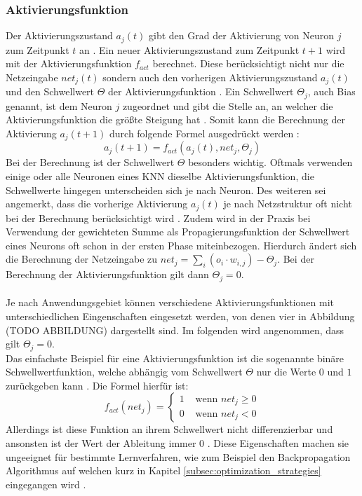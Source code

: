 \subsubsection{Aktivierungsfunktion}
Der Aktivierungszustand $a_j(t)$ gibt den Grad der Aktivierung von Neuron $j$ zum Zeitpunkt $t$ an \cite{zell2003simulation}. Ein neuer Aktivierungszustand zum Zeitpunkt $t+1$ wird mit der Aktivierungsfunktion $f_{act}$ berechnet. Diese berücksichtigt nicht nur die Netzeingabe $net_j(t)$ sondern auch den vorherigen Aktivierungszustand $a_j(t)$ und den Schwellwert $\Theta$ der Aktivierungsfunktion \cite{zell2003simulation}. Ein Schwellwert $\Theta_j$, auch Bias genannt, ist dem Neuron $j$ zugeordnet und gibt die Stelle an, an welcher die Aktivierungsfunktion die größte Steigung hat \cite{kriesel2008kleiner}. Somit kann die Berechnung der Aktivierung $a_j(t+1)$ durch folgende Formel ausgedrückt werden \cite{zell2003simulation}:
$$a_j(t+1)=f_{act}(a_j(t), net_j, \Theta_j)$$
Bei der Berechnung ist der Schwellwert $\Theta$ besonders wichtig. Oftmals verwenden einige oder alle Neuronen eines \ac{KNN} dieselbe Aktivierungsfunktion, die Schwellwerte hingegen unterscheiden sich je nach Neuron. Des weiteren sei angemerkt, dass  die vorherige Aktivierung $a_j(t)$ je nach Netzstruktur oft nicht bei der Berechnung berücksichtigt wird \cite{kriesel2008kleiner}. Zudem wird in der Praxis bei Verwendung der gewichteten Summe als Propagierungsfunktion der Schwellwert eines Neurons oft schon in der ersten Phase miteinbezogen. Hierdurch ändert sich die Berechnung der Netzeingabe zu $net_j=\sum_{i}(o_{i} \cdot w_{i, j}) - \Theta_j$. Bei der Berechnung der Aktivierungsfunktion gilt dann $\Theta_j = 0$.
\\\\
Je nach Anwendungsgebiet können verschiedene Aktivierungsfunktionen mit unterschiedlichen Eingenschaften eingesetzt werden, von denen vier in Abbildung (TODO ABBILDUNG) dargestellt sind. Im folgenden wird angenommen, dass gilt $\Theta_j=0$.\\
Das einfachste Beispiel für eine Aktivierungsfunktion ist die sogenannte binäre Schwellwertfunktion, welche abhängig vom Schwellwert $\Theta$ nur die Werte $0$ und $1$ zurückgeben kann \cite{kriesel2008kleiner}. Die Formel hierfür ist: 
$$
f_{act}(net_j)=\left\{\begin{array}{ll}
1 & \text { wenn } net_j \geq 0 \\
0 & \text { wenn } net_j < 0
\end{array}\right.
$$
Allerdings ist diese Funktion an ihrem Schwellwert nicht differenzierbar und ansonsten ist der Wert der Ableitung immer 0 \cite{kriesel2008kleiner}. Diese Eigenschaften machen sie ungeeignet für bestimmte Lernverfahren, wie zum Beispiel den Backpropagation Algorithmus auf welchen kurz in Kapitel \ref{subsec:optimization_strategies} eingegangen wird \cite{kriesel2008kleiner}.
